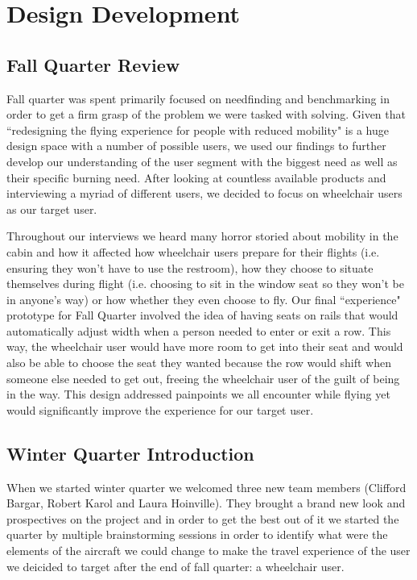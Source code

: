 \chapter{Design Development}

\section{Fall Quarter Review}
Fall quarter was spent primarily focused on needfinding and benchmarking in order to get a firm grasp of the problem we were tasked with solving. Given that ``redesigning the flying experience for people with reduced mobility" is a huge design space with a number of possible users, we used our findings to further develop our understanding of the user segment with the biggest need as well as their specific burning need. After looking at countless available products and interviewing a myriad of different users, we decided to focus on wheelchair users as our target user. 


Throughout our interviews we heard many horror storied about mobility in the cabin and how it affected how wheelchair users prepare for their flights (i.e. ensuring they won't have to use the restroom), how they choose to situate themselves during flight (i.e. choosing to sit in the window seat so they won't be in anyone's way) or how whether they even choose to fly. Our final ``experience" prototype for Fall Quarter involved the idea of having seats on rails that would automatically adjust width when a person needed to enter or exit a row. This way, the wheelchair user would have more room to get into their seat and would also be able to choose the seat they wanted because the row would shift when someone else needed to get out, freeing the wheelchair user of the guilt of being in the way. This design addressed painpoints we all encounter while flying yet would significantly improve the experience for our target user. 

\section{Winter Quarter Introduction}
When we started winter quarter we welcomed three new team members (Clifford Bargar, Robert Karol and Laura Hoinville). They brought a brand new look and prospectives on the project and in order to get the best out of it we started the quarter by multiple brainstorming sessions in order to identify what were the elements of the aircraft we could change to make the travel experience of the user we deicided to target after the end of fall quarter: a wheelchair user. 

